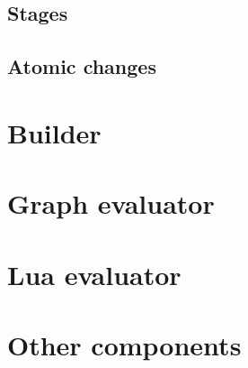 \subsection{Stages}

\subsection{Atomic changes}



\section{Builder}

\section{Graph evaluator}

\section{Lua evaluator}

\section{Other components}

